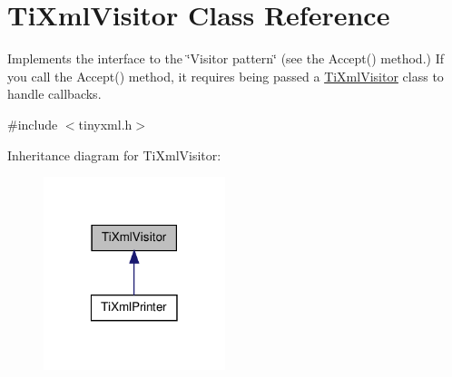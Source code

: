 \hypertarget{classTiXmlVisitor}{
\section{TiXmlVisitor Class Reference}
\label{d9/d74/classTiXmlVisitor}
}


Implements the interface to the \char`\"{}Visitor pattern\char`\"{} (see the Accept() method.) If you call the Accept() method, it requires being passed a \hyperlink{classTiXmlVisitor}{TiXmlVisitor} class to handle callbacks.  




{\ttfamily \#include $<$tinyxml.h$>$}



Inheritance diagram for TiXmlVisitor:
\nopagebreak
\begin{figure}[H]
\begin{center}
\leavevmode
\includegraphics[width=150pt]{d2/dd8/classTiXmlVisitor__inherit__graph}
\end{center}
\end{figure}
